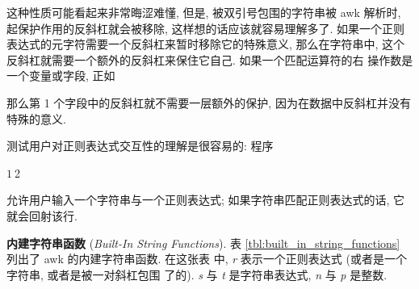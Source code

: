 这种性质可能看起来非常晦涩难懂, 但是, 被双引号包围的字符串被 awk 解析时,
起保护作用的反斜杠就会被移除, 这样想的话应该就容易理解多了. 如果一个正则
表达式的元字符需要一个反斜杠来暂时移除它的特殊意义, 那么在字符串中,
这个反斜杠就需要一个额外的反斜杠来保住它自己. 如果一个匹配运算符的右
操作数是一个变量或字段, 正如
那么第 1 个字段中的反斜杠就不需要一层额外的保护, 因为在数据中反斜杠并没有
特殊的意义.

测试用户对正则表达式交互性的理解是很容易的: 程序
\begin{awkcode}
    $1 ~ $2
\end{awkcode}
允许用户输入一个字符串与一个正则表达式; 如果字符串匹配正则表达式的话, 它
就会回射该行.

\textbf{内建字符串函数} (\emph{Built-In String Functions}). 表
\ref{tbl:built_in_string_functions} 列出了 awk 的内建字符串函数. 在这张表
中, \textit{r} 表示一个正则表达式 (或者是一个字符串, 或者是被一对斜杠包围
了的). \textit{s} 与 \textit{t} 是字符串表达式, \textit{n} 与 \textit{p}
是整数.
